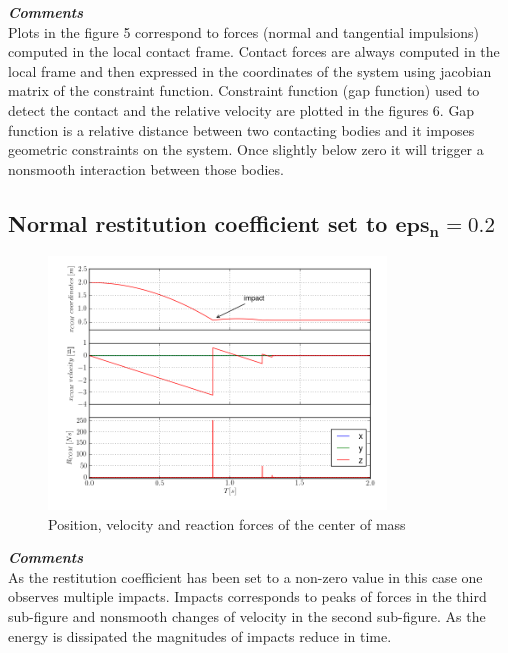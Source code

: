 \noindent \textbf{\textit{\Large{Comments}}}\\[1mm]
\noindent Plots in the figure 5 correspond to forces (normal and tangential impulsions) computed in the local contact frame.
Contact forces are always computed in the local frame and then expressed in the coordinates of the system using jacobian matrix of the constraint function. 
Constraint function (gap function) used to detect the contact and the relative velocity are plotted in the figures 6. Gap function is a relative distance between two contacting
bodies and it imposes geometric constraints on the system. Once slightly below zero it will trigger a nonsmooth interaction between those bodies.\\ 

\subsection{Normal restitution coefficient set to $\boldsymbol{eps_{n} = 0.2}$}

\begin{figure}[H]
  \centering
    \includegraphics[width=0.8\textwidth]{xvpCOMrest}
  \caption{Position, velocity and reaction forces of the center of mass}
\end{figure}

\noindent \textbf{\textit{\Large{Comments}}}\\[1mm]
\noindent As the restitution coefficient has been set to a non-zero value in this case one observes multiple impacts. Impacts corresponds to peaks of forces in the third sub-figure and 
nonsmooth changes of velocity in the second sub-figure. As the energy is dissipated the magnitudes of impacts reduce in time.\\

